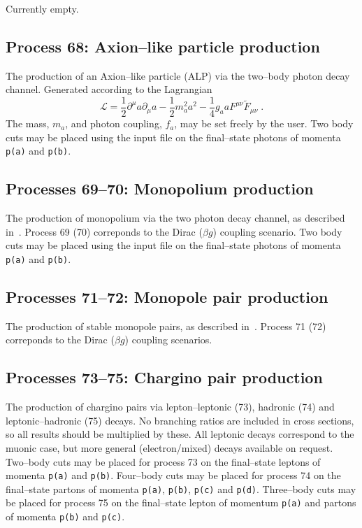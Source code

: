 \documentclass[12pt]{article}
\begin{document}
Currently empty.

\subsection{Process 68: Axion--like particle production}

The production of an Axion--like particle (ALP) via the two--body photon decay channel. Generated according to the Lagrangian
\begin{equation}
\mathcal{L}=\frac{1}{2}\partial^\mu a \partial_\mu a -\frac{1}{2}m_a^2 a^2 -\frac{1}{4}g_a a F^{\mu\nu}\tilde{F}_{\mu\nu}\;.
\end{equation}
The mass, $m_a$, and photon coupling, $f_a$, may be set freely by the user.  Two body cuts may be placed using the input file on the final--state
 photons of momenta  \texttt{p(a)} and \texttt{p(b)}.

\subsection{Processes 69--70: Monopolium production}

The production of monopolium via the two photon decay channel, as described in~\cite{Epele:2012jn}. Process 69 (70) correponds to the Dirac 
($\beta g$) coupling scenario. Two body cuts may be placed using the input file on the final--state photons of momenta  \texttt{p(a)} and \texttt{p(b)}.  

\subsection{Processes 71--72: Monopole pair production}

The production of stable monopole pairs, as described in~\cite{Epele:2012jn}. Process 71 (72) correponds to the Dirac ($\beta g$) coupling 
scenarios.

\subsection{Processes 73--75: Chargino pair production}

The production of chargino pairs via lepton--leptonic (73), hadronic (74) and leptonic--hadronic (75) decays. No branching ratios are included in 
cross sections, so all results should be multiplied by these. All leptonic decays correspond to the muonic case, but more general (electron/mixed) 
decays available on request. Two--body cuts may be placed for process 73 on the final--state leptons of momenta  \texttt{p(a)} and \texttt{p(b)}. 
Four--body cuts may be placed for process 74 on the final--state partons of momenta  \texttt{p(a)}, \texttt{p(b)}, \texttt{p(c)} and \texttt{p(d)}. 
Three--body cuts may be placed for process 75 on the final--state lepton of momentum  \texttt{p(a)} and partons of momenta \texttt{p(b)} and \texttt{p(c)}.
\end{document}
